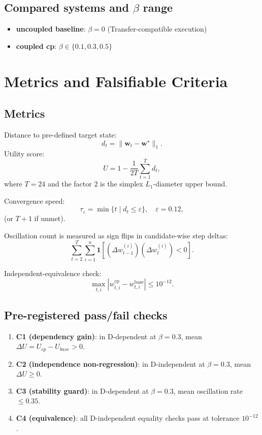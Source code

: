 \documentclass[11pt,a4paper]{article}
\begin{document}
\subsection{Compared systems and \(\beta\) range}
\begin{itemize}
  \item \textbf{uncoupled baseline}: \(\beta=0\) (Transfer-compatible execution)
  \item \textbf{coupled cp}: \(\beta\in\{0.1,0.3,0.5\}\)
\end{itemize}

\section{Metrics and Falsifiable Criteria}
\subsection{Metrics}
Distance to pre-defined target state:
\[
d_t = \lVert \mathbf{w}_t-\mathbf{w}^{\star} \rVert_1.
\]
Utility score:
\[
U = 1 - \frac{1}{2T}\sum_{t=1}^{T} d_t,
\]
where \(T=24\) and the factor \(2\) is the simplex \(L_1\)-diameter upper bound.

Convergence speed:
\[
\tau_{\varepsilon} = \min\{t\mid d_t\le\varepsilon\},\quad \varepsilon=0.12,
\]
(or \(T+1\) if unmet).

Oscillation count is measured as sign flips in candidate-wise step deltas:
\[
\sum_{t=2}^{T} \sum_{i=1}^{n} \mathbf{1}\left[(\Delta w_{t-1}^{(i)})(\Delta w_t^{(i)})<0\right].
\]

Independent-equivalence check:
\[
\max_{t,i}\left|w^{\mathrm{cp}}_{t,i}-w^{\mathrm{base}}_{t,i}\right|\le 10^{-12}.
\]

\subsection{Pre-registered pass/fail checks}
\begin{enumerate}
  \item \textbf{C1 (dependency gain)}: in D-dependent at \(\beta=0.3\), mean \(\Delta U=U_{cp}-U_{base} > 0\).
  \item \textbf{C2 (independence non-regression)}: in D-independent at \(\beta=0.3\), mean \(\Delta U \ge 0\).
  \item \textbf{C3 (stability guard)}: in D-dependent at \(\beta=0.3\), mean oscillation rate \(\le 0.35\).
  \item \textbf{C4 (equivalence)}: all D-independent equality checks pass at tolerance \(10^{-12}\).
\end{enumerate}
\end{document}
